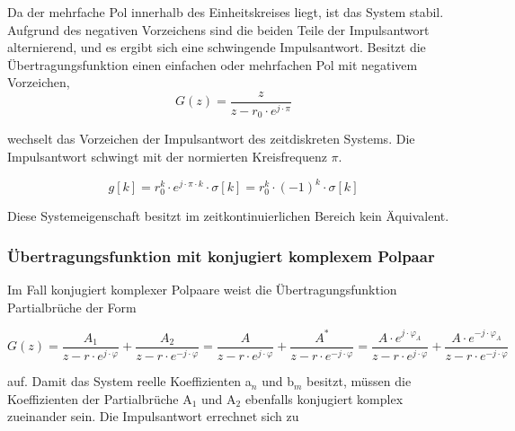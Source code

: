 \noindent Da der mehrfache Pol innerhalb des Einheitskreises liegt, ist das System stabil. Aufgrund des negativen Vorzeichens sind die beiden Teile der Impulsantwort alternierend, und es ergibt sich eine schwingende Impulsantwort. Besitzt die \"{U}bertragungsfunktion einen einfachen oder mehrfachen Pol mit negativem Vorzeichen, 
\begin{equation}\label{eq:sixsonehundredone}
G\left(z\right)=\frac{z}{z-r_{0} \cdot e^{j\cdot \pi } }
\end{equation}

\noindent wechselt das Vorzeichen der Impulsantwort des zeitdiskreten Systems. Die Impulsantwort schwingt mit der normierten Kreisfrequenz $\pi$.

\begin{equation}\label{eq:sixsonehundredtwo}
g\left[k\right]=r_{0}^{k} \cdot e^{j\cdot \pi \cdot k} \cdot \sigma \left[k\right]=r_{0}^{k} \cdot \left(-1\right)^{k} \cdot \sigma \left[k\right]
\end{equation}

\noindent Diese Systemeigenschaft besitzt im zeitkontinuierlichen Bereich kein \"{A}quivalent.

\clearpage

\subsubsection{\"{U}bertragungsfunktion mit konjugiert komplexem Polpaar}

\noindent Im Fall konjugiert komplexer Polpaare weist die \"{U}bertragungsfunktion Partialbr\"{u}che der Form 

\begin{equation}\label{eq:sixsonehundredthree}
G\left(z\right)=\frac{A_{1} }{z-r\cdot e^{j\cdot \varphi } } +\frac{A_{2} }{z-r\cdot e^{-j\cdot \varphi } } =\frac{A}{z-r\cdot e^{j\cdot \varphi } } +\frac{A^{*} }{z-r\cdot e^{-j\cdot \varphi } } =\frac{A\cdot e^{j\cdot \varphi _{A} } }{z-r\cdot e^{j\cdot \varphi } } +\frac{A\cdot e^{-j\cdot \varphi _{A} } }{z-r\cdot e^{-j\cdot \varphi } }
\end{equation}

\noindent auf. Damit das System reelle Koeffizienten a${}_{n}$ und b${}_{m}$ besitzt, m\"{u}ssen die Koeffizienten der Partialbr\"{u}che A${}_{1}$ und A${}_{2}$ ebenfalls konjugiert komplex zueinander sein. Die Impulsantwort errechnet sich zu

